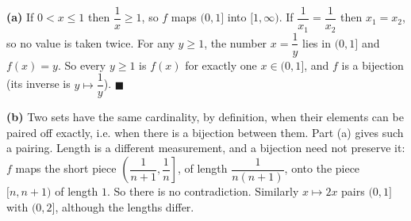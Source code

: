 \textbf{(a)} If $0<x\le1$ then $\dfrac1x\ge1$, so $f$ maps $(0,1]$ into $[1,\infty)$. If $\dfrac1{x_1}=\dfrac1{x_2}$ then $x_1=x_2$, so no value is taken twice. For any $y\ge1$, the number $x=\dfrac1y$ lies in $(0,1]$ and $f(x)=y$. So every $y\ge1$ is $f(x)$ for exactly one $x\in(0,1]$, and $f$ is a bijection (its inverse is $y\mapsto\dfrac1y$). $\blacksquare$

\textbf{(b)} Two sets have the same cardinality, by definition, when their elements can be paired off exactly, i.e. when there is a bijection between them. Part (a) gives such a pairing. Length is a different measurement, and a bijection need not preserve it: $f$ maps the short piece $\left(\dfrac{1}{n+1},\dfrac1n\right]$, of length $\dfrac{1}{n(n+1)}$, onto the piece $[n,n+1)$ of length $1$. So there is no contradiction. Similarly $x\mapsto2x$ pairs $(0,1]$ with $(0,2]$, although the lengths differ.
